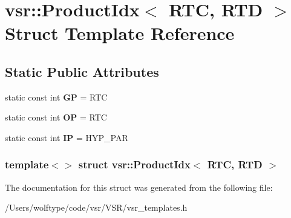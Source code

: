 \hypertarget{structvsr_1_1_product_idx_3_01_r_t_c_00_01_r_t_d_01_4}{\section{vsr\-:\-:Product\-Idx$<$ R\-T\-C, R\-T\-D $>$ Struct Template Reference}
\label{structvsr_1_1_product_idx_3_01_r_t_c_00_01_r_t_d_01_4}
}
\subsection*{Static Public Attributes}
\begin{DoxyCompactItemize}
\item 
\hypertarget{structvsr_1_1_product_idx_3_01_r_t_c_00_01_r_t_d_01_4_a93e6080395cb966dcc7c10d038c42081}{static const int {\bfseries G\-P} = R\-T\-C}\label{structvsr_1_1_product_idx_3_01_r_t_c_00_01_r_t_d_01_4_a93e6080395cb966dcc7c10d038c42081}

\item 
\hypertarget{structvsr_1_1_product_idx_3_01_r_t_c_00_01_r_t_d_01_4_a79f14703b2673882ec7b581f41f7172a}{static const int {\bfseries O\-P} = R\-T\-C}\label{structvsr_1_1_product_idx_3_01_r_t_c_00_01_r_t_d_01_4_a79f14703b2673882ec7b581f41f7172a}

\item 
\hypertarget{structvsr_1_1_product_idx_3_01_r_t_c_00_01_r_t_d_01_4_aab9f287a25a01f2868cdec3af19ea12f}{static const int {\bfseries I\-P} = H\-Y\-P\-\_\-\-P\-A\-R}\label{structvsr_1_1_product_idx_3_01_r_t_c_00_01_r_t_d_01_4_aab9f287a25a01f2868cdec3af19ea12f}

\end{DoxyCompactItemize}
\subsubsection*{template$<$$>$ struct vsr\-::\-Product\-Idx$<$ R\-T\-C, R\-T\-D $>$}



The documentation for this struct was generated from the following file\-:\begin{DoxyCompactItemize}
\item 
/\-Users/wolftype/code/vsr/\-V\-S\-R/vsr\-\_\-templates.\-h\end{DoxyCompactItemize}
